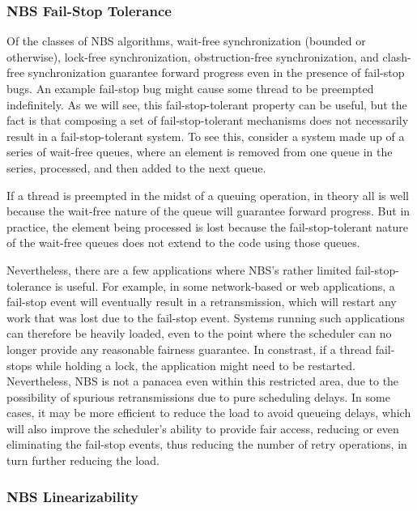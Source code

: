 \subsubsection{NBS Fail-Stop Tolerance}
\label{sec:advsync:NBS Fail-Stop Tolerance}

Of the classes of NBS algorithms, wait-free synchronization (bounded or
otherwise), lock-free synchronization, obstruction-free synchronization,
and clash-free synchronization guarantee forward progress even in the
presence of fail-stop bugs.
An example fail-stop bug might cause some thread to be preempted indefinitely.
As we will see, this fail-stop-tolerant property can be useful, but the
fact is that composing a set of fail-stop-tolerant mechanisms does not
necessarily result in a fail-stop-tolerant system.
To see this, consider a system made up of a series of wait-free queues,
where an element is removed from one queue in the series, processed,
and then added to the next queue.

If a thread is preempted in the midst of a queuing operation, in theory
all is well because the wait-free nature of the queue will guarantee
forward progress.
But in practice, the element being processed is lost because the
fail-stop-tolerant nature of the wait-free queues does not extend to
the code using those queues.

Nevertheless, there are a few applications where NBS's rather limited
fail-stop-tolerance is useful.
For example, in some network-based or web applications, a fail-stop
event will eventually result in a retransmission, which will restart
any work that was lost due to the fail-stop event.
Systems running such applications can therefore be heavily loaded, even
to the point where the scheduler can no longer provide any reasonable
fairness guarantee.
In constrast, if a thread fail-stops while holding a lock, the application
might need to be restarted.
Nevertheless, NBS is not a panacea even within this restricted area,
due to the possibility of spurious retransmissions due to pure scheduling
delays.
In some cases, it may be more efficient to reduce the load to avoid
queueing delays, which will also improve the scheduler's ability to
provide fair access, reducing or even eliminating the fail-stop events,
thus reducing the number of retry operations, in turn further reducing
the load.

\subsubsection{NBS Linearizability}
\label{sec:advsync:NBS Linearizability}

